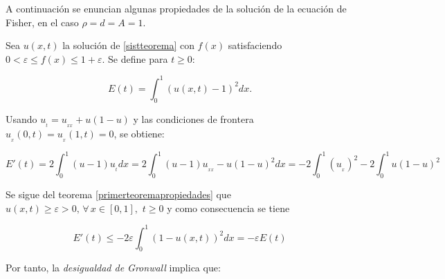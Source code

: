 A continuación se enuncian algunas propiedades de la solución de la ecuación de Fisher, en el caso $\rho=d=A=1$.\\
 
\begin{teorem}\label{primerteoremapropiedades}
\end{teorem}

Sea $u(x,t)$ la solución de \eqref{sistteorema} con $f(x)$ satisfaciendo $0<\varepsilon\leq f(x)\leq 1+\varepsilon$. Se define para $t\geq 0$:
 
$$E(t)=\int_{0}^{1}(u(x,t)-1)^{2}dx.$$

Usando $u_{_{t}}=u_{_{xx}}+u(1-u)$ y las condiciones de frontera $u_{_{x}}(0,t)=u_{_{x}}(1,t)=0$, se obtiene:

$$E'(t)=2\int_{0}^{1}(u-1)u_{_{t}}dx=2\int_{0}^{1}(u-1)u_{_{xx}}-u(1-u)^{2}dx=-2\int_{0}^{1}(u_{_{x}})^{2}-2\int_{0}^{1}u(1-u)^{2}$$

Se sigue del teorema \ref{primerteoremapropiedades} que $u(x,t)\geq\varepsilon>0,\,\forall\, x\in[0,1],\,\,t\geq 0$ y como consecuencia se tiene 

$$E'(t)\leq -2\varepsilon\int_{0}^{1}(1-u(x,t))^{2}dx=-\varepsilon E(t)$$

\vspace{0.4cm}
Por tanto, la \textit{desigualdad de Gronwall} implica que:
 
